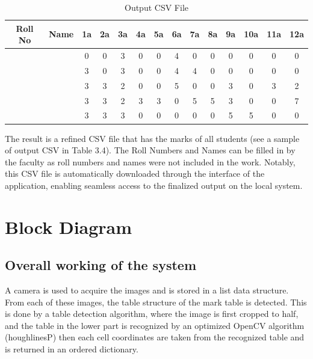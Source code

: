 
\begin{table}[ht]
  \centering
  \small
  \begin{tabular}{|c|c|c|c|c|c|c|c|c|c|c|c|c|c|}
  \hline
  Roll No & Name & 1a & 2a & 3a & 4a & 5a & 6a & 7a & 8a & 9a & 10a & 11a & 12a \\
  \hline
   &  & 0 & 0 & 3 & 0 & 0 & 4 & 0 & 0 & 0 & 0 & 0 & 0 \\
   \hline
   &  & 3 & 0 & 3 & 0 & 0 & 4 & 4 & 0 & 0 & 0 & 0 & 0 \\
   \hline
   &  & 3 & 3 & 2 & 0 & 0 & 5 & 0 & 0 & 3 & 0 & 3 & 2 \\
   \hline
   &  & 3 & 3 & 2 & 3 & 3 & 0 & 5 & 5 & 3 & 0 & 0 & 7 \\
   \hline
   &  & 3 & 3 & 3 & 0 & 0 & 0 & 0 & 0 & 5 & 5 & 0 & 0 \\
   \hline
  \end{tabular}
  \caption{Output CSV File}
\end{table}

\noindent The result is a refined CSV file that has the marks of all students (see a sample of output CSV in Table 3.4). The Roll Numbers and Names can be filled in by the faculty as roll numbers and names were not included in the work. Notably, this CSV file is automatically downloaded through the interface of the application, enabling seamless access to the finalized output on the local system.

\clearpage

\section{Block Diagram}

\subsection{Overall working of the system}

\noindent A camera is used to acquire the images and is stored in a list data structure. From each of these images, the table structure of the mark table is detected. This is done by a table detection algorithm, where the image is first cropped to half, and the table in the lower part is recognized by an optimized OpenCV algorithm (houghlinesP) then each cell coordinates are taken from the recognized table and is returned in an ordered dictionary.\\


